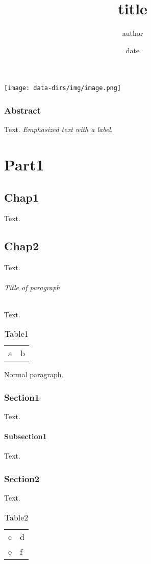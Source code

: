\documentclass[a4paper,11pt]{book}
\title{title}
\author{author}
\date{date}
\begin{document}
\maketitle
\setcounter{tocdepth}{0}
\tableofcontents
\texttt{[image: data-dirs/img/image.png]}

\section*{Abstract}
\label{s:1}
Text.
\hypertarget{label1}{}\emph{Emphasized text with a label}.

\part{Part1}
\label{s:2}
\setcounter{tocdepth}{0}
\minitoc
\chapter{Chap1}
\label{s:3}
Text.

\chapter{Chap2}
\label{s:4}
\setcounter{tocdepth}{3}
\minitoc
Text.

\paragraph{Title of paragraph}
Text.
\begin{table}[htbp]
\begin{tabular}{ll}
a & b \\
\end{tabular}
\caption{Table1}
\label{tbl:1}
\end{table}

Normal paragraph.

\section{Section1}
\label{s:5}
Text.

\subsection{Subsection1}
\label{s:6}
Text.

\section{Section2}
\label{s:7}
Text.
\begin{table}[htbp]
\begin{tabular}{ll}
c & d \\
e & f \\
\end{tabular}
\caption{Table2}
\label{tbl:2}
\end{table}
\end{document}
